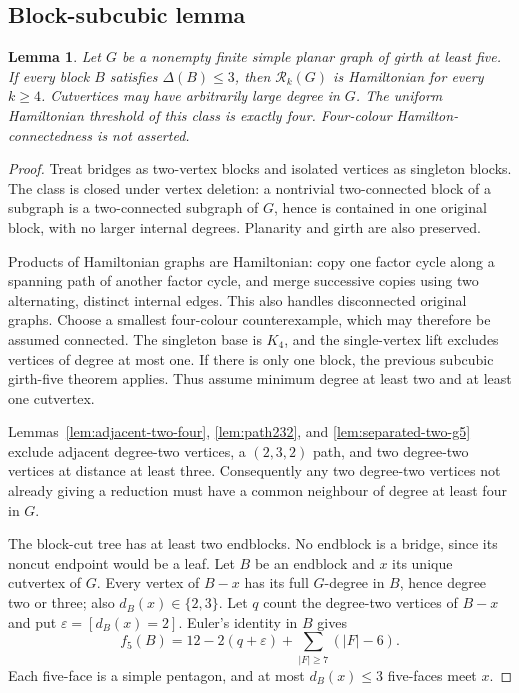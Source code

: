 \documentclass[11pt]{article}
\newtheorem{lemma}[theorem]{Lemma}
\theoremstyle{remark}
\newcommand{\Rk}{\mathcal R_k}
\numberwithin{equation}{section}
\begin{document}
\subsection{Block-subcubic lemma}
\begin{lemma}\label{lem:block-subcubic}
Let $G$ be a nonempty finite simple planar graph of girth at least
five. If every block $B$ satisfies $\Delta(B)\le3$, then $\Rk(G)$ is
Hamiltonian for every $k\ge4$. Cutvertices may have arbitrarily large
degree in $G$. The uniform Hamiltonian threshold of this class is exactly four.
Four-colour Hamilton-connectedness is not asserted.
\end{lemma}
\begin{proof}
Treat bridges as two-vertex blocks and isolated vertices as singleton
blocks. The class is closed under vertex deletion: a nontrivial
two-connected block of a subgraph is a two-connected subgraph of
$G$, hence is contained in one original block, with no larger
internal degrees. Planarity and girth are also preserved.

Products of Hamiltonian graphs are Hamiltonian: copy one factor
cycle along a spanning path of another factor cycle, and merge
successive copies using two alternating, distinct internal edges.
This also handles disconnected original graphs. Choose a smallest
four-colour counterexample, which may therefore be assumed connected.
The singleton base is $K_4$, and the single-vertex lift excludes
vertices of degree at most one. If there is only one block, the
previous subcubic girth-five theorem applies. Thus assume minimum
degree at least two and at least one cutvertex.

Lemmas~\ref{lem:adjacent-two-four}, \ref{lem:path232}, and
\ref{lem:separated-two-g5} exclude adjacent degree-two vertices, a
$(2,3,2)$ path, and two degree-two vertices at distance at least three.
Consequently any two degree-two vertices not already giving a
reduction must have a common neighbour of degree at least four in $G$.

The block-cut tree has at least two endblocks. No endblock is a
bridge, since its noncut endpoint would be a leaf. Let $B$ be an
endblock and $x$ its unique cutvertex of $G$. Every vertex of
$B-x$ has its full $G$-degree in $B$, hence degree two or three;
also $d_B(x)\in\{2,3\}$. Let $q$ count the degree-two vertices
of $B-x$ and put $\varepsilon=[d_B(x)=2]$. Euler's identity in $B$
gives
\[
 f_5(B)=12-2(q+\varepsilon)+\sum_{|F|\ge7}(|F|-6).
\]
Each five-face is a simple pentagon, and at most $d_B(x)\le3$
five-faces meet $x$.


\end{proof}
\end{document}
